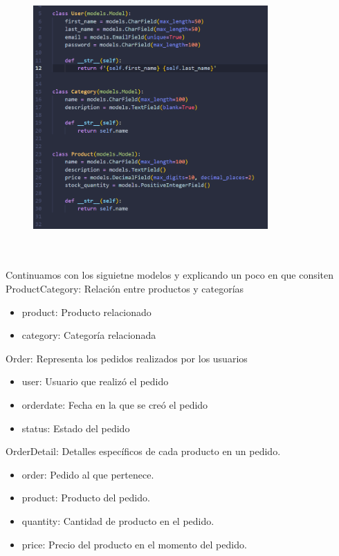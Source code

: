 \documentclass{article}
\begin{document}
     \begin{figure}[H]
		          \centering
		          \includegraphics[width=0.8\textwidth,keepaspectratio]                       {img/UserCatPro.png}
    \end{figure}
\\
\\Continuamos con los siguietne modelos y explicando un poco en que consiten
ProductCategory: Relación entre productos y categorías
\begin{itemize}
    \item product: Producto relacionado
    \item category: Categoría relacionada
\end{itemize}
Order: Representa los pedidos realizados por los usuarios
\begin{itemize}
    \item user: Usuario que realizó el pedido
    \item orderdate: Fecha en la que se creó el pedido
    \item status: Estado del pedido 
\end{itemize}
OrderDetail: Detalles específicos de cada producto en un pedido.
\begin{itemize}
    \item order: Pedido al que pertenece.
    \item product: Producto del pedido.
    \item quantity: Cantidad de producto en el pedido.
    \item price: Precio del producto en el momento del pedido.
\end{itemize}
\end{document}
